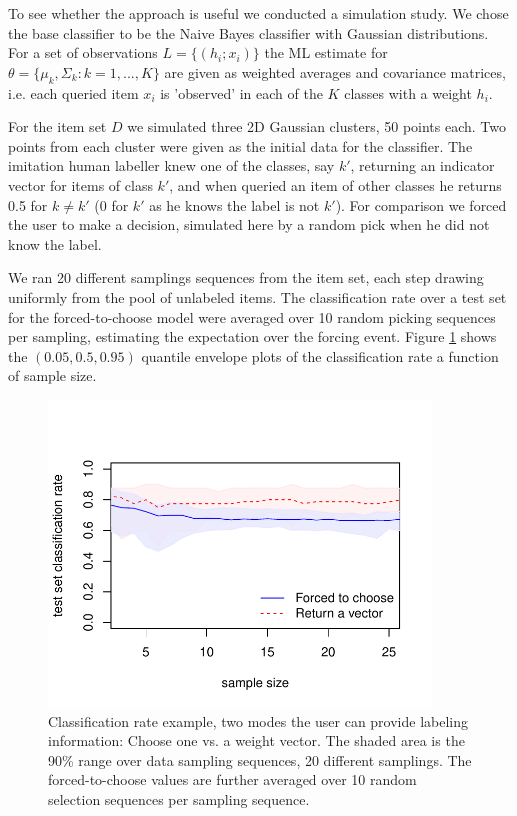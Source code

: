 \documentclass[10pt, onecolumn]{article}
\begin{document}
To see whether the approach is useful we conducted a simulation study. We chose the base classifier to be the Naive Bayes classifier with Gaussian distributions. For a set of observations $L=\{(h_i;x_i)\}$ the ML estimate for $\theta=\{\mu_k, \Sigma_k: k=1,...,K\}$ are given as weighted averages and covariance matrices, i.e. each queried item $x_i$ is 'observed' in each of the $K$ classes with a weight $h_i$. 

For the item set $D$ we simulated three 2D Gaussian clusters, 50 points each. Two points from each cluster were given as the initial data for the classifier. The imitation human labeller knew one of the classes, say $k'$, returning an indicator vector for items of class $k'$, and when queried an item of other classes he returns 0.5 for $k\neq k'$ (0 for $k'$ as he knows the label is not $k'$). For comparison we forced the user to make a decision, simulated here by a random pick when he did not know the label.

We ran 20 different samplings sequences from the item set, each step drawing uniformly from the pool of unlabeled items. The classification rate over a test set for the forced-to-choose model were averaged over 10 random picking sequences per sampling, estimating the expectation over the forcing event. Figure \ref{fig:sampling1} shows the $(0.05,0.5,0.95)$ quantile envelope plots of the classification rate a function of sample size. 
\begin{figure}[hbtp]
\centering
\includegraphics[width=4in]{figures/choose1_vs_give_vector.pdf}
\caption{Classification rate example, two modes the user can provide labeling information: Choose one vs. a weight vector. The shaded area is the 90\% range over data sampling sequences, 20 different samplings. The forced-to-choose values are further averaged over 10 random selection sequences per sampling sequence.}
\label{fig:sampling1}
\end{figure}
\end{document}
